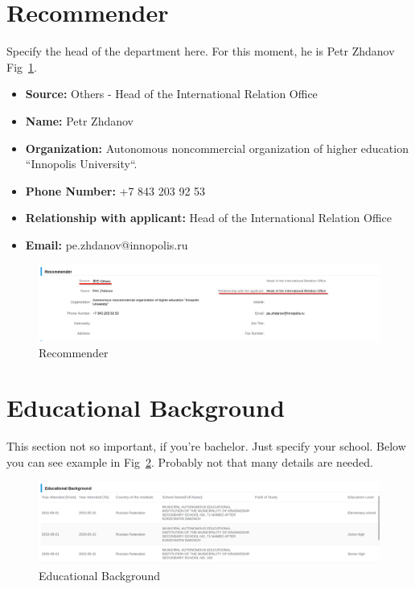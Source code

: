 \section{Recommender}
Specify the head of the department here.
For this moment, he is Petr Zhdanov Fig~\ref{fig:ru_recommender}.

\begin{itemize}
    \item \textbf{Source:} Others - Head of the International Relation Office
    \item \textbf{Name:} Petr Zhdanov
    \item \textbf{Organization:} Autonomous noncommercial organization of higher education ``Innopolis University``.
    \item \textbf{Phone Number:} +7 843 203 92 53
    \item \textbf{Relationship with applicant:} Head of the International Relation Office
    \item \textbf{Email:} pe.zhdanov@innopolis.ru
\end{itemize}


\begin{figure}[H]
    \centering
    \includegraphics[width=\textwidth]{russia/imgs/app_6_recommender}
    \caption{\centering Recommender}
    \label{fig:ru_recommender}
\end{figure}







\section{Educational Background}\label{sec:ru_edu}

This section not so important, if you're bachelor.
Just specify your school.
Below you can see example in Fig~\ref{fig:ru_edu_back}.
Probably not that many details are needed.


\begin{figure}[H]
    \centering
    \includegraphics[width=\textwidth]{russia/imgs/app_edu_back}
    \caption{\centering Educational Background}
    \label{fig:ru_edu_back}
\end{figure}








